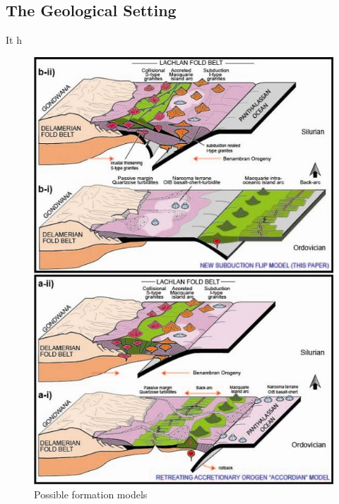 \documentclass[a4paper]{article}
\begin{document}
\subsection{The Geological Setting}

It h
\begin{figure}[H]
\centering
\includegraphics[width=1\textwidth]{granite_models.jpg}
\caption{\label{fig:GraniteModels} Possible formation models}
\end{figure}
\end{document}
